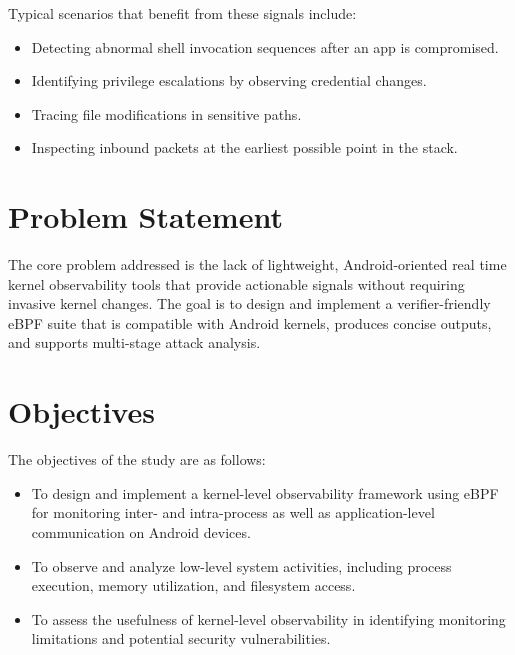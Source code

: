 \documentclass{mnitjaipur}
\begin{document}
Typical scenarios that benefit from these signals include:
\begin{itemize}
  \item Detecting abnormal shell invocation sequences after an app is compromised.
  \item Identifying privilege escalations by observing credential changes.
  \item Tracing file modifications in sensitive paths.
  \item Inspecting inbound packets at the earliest possible point in the stack.
\end{itemize}

\section{Problem Statement}
The core problem addressed is the lack of lightweight, Android-oriented real time kernel observability tools that provide actionable signals without requiring invasive kernel changes. The goal is to design and implement a verifier-friendly eBPF suite that is compatible with Android kernels, produces concise outputs, and supports multi-stage attack analysis.

\section{Objectives}
The objectives of the study are as follows:
\begin{itemize}
    \item To design and implement a kernel-level observability framework using eBPF for monitoring inter- and intra-process as well as application-level communication on Android devices.
    \item To observe and analyze low-level system activities, including process execution, memory utilization, and filesystem access.
    \item To assess the usefulness of kernel-level observability in identifying monitoring limitations and potential security vulnerabilities.
\end{itemize}


\end{document}
